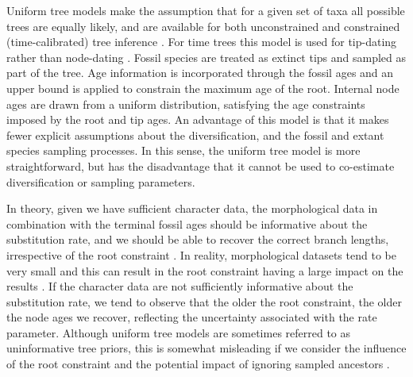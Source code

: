 Uniform tree models make the assumption that for a given set of taxa all possible trees are equally likely, and are available for both unconstrained and constrained (time-calibrated) tree inference \citep{Huelsenbeck2001a,Ronquist2012a}.
For time trees this model is used for tip-dating rather than node-dating \citep{Ronquist2012a}.
Fossil species are treated as extinct tips and sampled as part of the tree.
Age information is incorporated through the fossil ages and an upper bound is applied to constrain the maximum age of the root.
Internal node ages are drawn from a uniform distribution, satisfying the age constraints imposed by the root and tip ages.
An advantage of this model is that it makes fewer explicit assumptions about the diversification, and the fossil and extant species sampling processes.
In this sense, the  uniform tree model is more straightforward, but has the disadvantage that it cannot be used to co-estimate diversification or sampling parameters.

In theory, given we have sufficient character data, the morphological data in combination with the terminal fossil ages should be informative about the substitution rate, and we should be able to recover the correct branch lengths, irrespective of the root constraint \citep{Ronquist2012a,Klopfstein2019}.
In reality, morphological datasets tend to be very small and this can result in the root constraint having a large impact on the results \citep{matzke2016}.
If the character data are not sufficiently informative about the substitution rate, we tend to observe that the older the root constraint, the older the node ages we recover, reflecting the uncertainty associated with the rate parameter.
Although uniform tree models are sometimes referred to as uninformative tree priors, this is somewhat misleading if we consider the influence of the root constraint and the potential impact of ignoring sampled ancestors \citep{Gavryushkina2014}.

